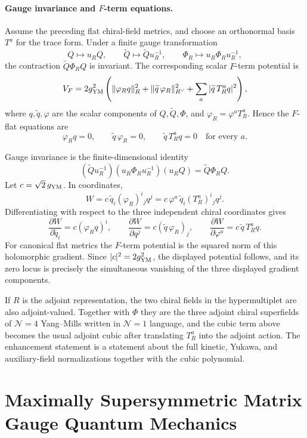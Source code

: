 \paragraph{Gauge invariance and \(F\)-term equations.}
Assume the preceding flat chiral-field metrics, and choose an orthonormal
basis \(T^a\) for the trace form.  Under a finite gauge transformation
\[
  Q\mapsto u_R Q,
  \qquad
  \widetilde Q\mapsto \widetilde Q u_R^{-1},
  \qquad
  \Phi_R\mapsto u_R\Phi_Ru_R^{-1},
\]
the contraction \(\widetilde Q\Phi_R Q\) is invariant.  The corresponding
scalar \(F\)-term potential is
\[
  V_F
  =
  2g_{\rm YM}^2
  \left(
    \|\varphi_R q\|_R^2
    +\|\widetilde q\,\varphi_R\|_{R^\vee}^2
    +\sum_a|\widetilde q\,T_R^a q|^2
  \right),
\]
where \(q,\widetilde q,\varphi\) are the scalar components of
\(Q,\widetilde Q,\Phi\), and
\(\varphi_R=\varphi^aT_R^a\).  Hence the \(F\)-flat equations are
\[
  \varphi_R q=0,
  \qquad
  \widetilde q\,\varphi_R=0,
  \qquad
  \widetilde q\,T_R^a q=0
  \quad\text{for every }a .
\]

Gauge invariance is the finite-dimensional identity
\[
  (\widetilde Q u_R^{-1})
  (u_R\Phi_Ru_R^{-1})
  (u_R Q)
  =
  \widetilde Q\Phi_RQ .
\]
Let \(c=\sqrt2\,g_{\rm YM}\).  In coordinates,
\[
  W=c\,\widetilde q_i(\varphi_R)^i{}_j q^j
    =c\,\varphi^a\,\widetilde q_i(T_R^a)^i{}_j q^j .
\]
Differentiating with respect to the three independent chiral coordinates
gives
\[
  \frac{\partial W}{\partial \widetilde q_i}
    =c(\varphi_R q)^i,\qquad
  \frac{\partial W}{\partial q^j}
    =c(\widetilde q\,\varphi_R)_j,\qquad
  \frac{\partial W}{\partial\varphi^a}
    =c\,\widetilde q\,T_R^a q .
\]
For canonical flat metrics the \(F\)-term potential is the squared norm of
this holomorphic gradient.  Since \(|c|^2=2g_{\rm YM}^2\), the displayed
potential follows, and its zero locus is precisely the simultaneous
vanishing of the three displayed gradient components.

If \(R\) is the adjoint representation, the two chiral fields in the
hypermultiplet are also adjoint-valued.  Together with \(\Phi\) they are the
three adjoint chiral superfields of \(\mathcal N=4\) Yang--Mills written in
\(\mathcal N=1\) language, and the cubic term above becomes the usual
adjoint cubic after translating \(T_R^a\) into the adjoint action.  The
enhancement statement is a statement about the full kinetic, Yukawa, and
auxiliary-field normalizations together with the cubic polynomial.

\section{Maximally Supersymmetric Matrix Gauge Quantum Mechanics}
\label{sec:maximal-susy-matrix-gauge-qm}

